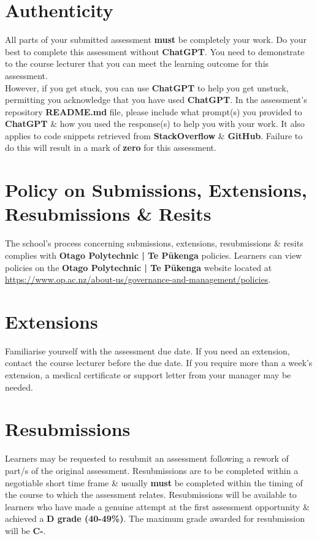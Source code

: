 \documentclass{article}
\begin{document}
\section*{Authenticity}
All parts of your submitted assessment \textbf{must} be completely your work. Do your best to complete this assessment without \textbf{ChatGPT}. You need to demonstrate to the course lecturer that you can meet the learning outcome for this assessment. \\
 
 However, if you get stuck, you can use \textbf{ChatGPT} to help you get unstuck, permitting you acknowledge that you have used \textbf{ChatGPT}. In the assessment's repository \textbf{README.md} file, please include what prompt(s) you provided to \textbf{ChatGPT} \& how you used the response(s) to help you with your work. It also applies to code snippets retrieved from \textbf{StackOverflow} \& \textbf{GitHub}. Failure to do this will result in a mark of \textbf{zero} for this assessment.

\section*{Policy on Submissions, Extensions, Resubmissions \& Resits}
The school's process concerning submissions, extensions, resubmissions \& resits complies with \textbf{Otago Polytechnic | Te Pūkenga} policies. Learners can view policies on the \textbf{Otago Polytechnic | Te Pūkenga} website located at \href{https://www.op.ac.nz/about-us/governance-and-management/policies}{https://www.op.ac.nz/about-us/governance-and-management/policies}. 

\section*{Extensions}
Familiarise yourself with the assessment due date. If you need an extension, contact the course lecturer before the due date. If you require more than a week's extension, a medical certificate or support letter from your manager may be needed.

\section*{Resubmissions}
Learners may be requested to resubmit an assessment following a rework of part/s of the original assessment. Resubmissions are to be completed within a negotiable short time frame \& usually \textbf{must} be completed within the timing of the course to which the assessment relates. Resubmissions will be available to learners who have made a genuine attempt at the first assessment opportunity \& achieved a \textbf{D grade (40-49\%)}. The maximum grade awarded for resubmission will be \textbf{C-}.
\end{document}
